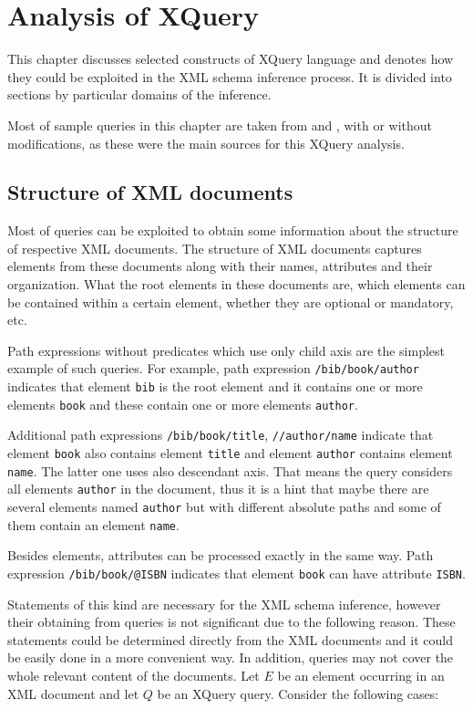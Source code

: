 \chapter{Analysis of XQuery} \label{CHAPTER_analysis_of_xquery}
This chapter discusses selected constructs of XQuery language and denotes how they could be exploited in the XML schema inference process. It is divided into sections by particular domains of the inference.

Most of sample queries in this chapter are taken from \cite{Walmsley:2007:XQU:1205865} and \cite{Marchiori:07:XQU}, with or without modifications, as these were the main sources for this XQuery analysis.

\section{Structure of XML documents}
Most of queries can be exploited to obtain some information about the structure of respective XML documents. The structure of XML documents captures elements from these documents along with their names, attributes and their organization. What the root elements in these documents are, which elements can be contained within a certain element, whether they are optional or mandatory, etc.

Path expressions without predicates which use only child axis are the simplest example of such queries. For example, path expression \texttt{/bib/book/author} indicates that element \texttt{bib} is the root element and it contains one or more elements \texttt{book} and these contain one or more elements \texttt{author}.

Additional path expressions \texttt{/bib/book/title}, \texttt{//author/name} indicate that element \texttt{book} also contains element \texttt{title} and element \texttt{author} contains element \texttt{name}. The latter one uses also descendant axis. That means the query considers all elements \texttt{author} in the document, thus it is a hint that maybe there are several elements named \texttt{author} but with different absolute paths and some of them contain an element \texttt{name}.

Besides elements, attributes can be processed exactly in the same way. Path expression \texttt{/bib/book/@ISBN} indicates that element \texttt{book} can have attribute \texttt{ISBN}.

Statements of this kind are necessary for the XML schema inference, however their obtaining from queries is not significant due to the following reason. These statements could be determined directly from the XML documents and it could be easily done in a more convenient way. In addition, queries may not cover the whole relevant content of the documents. Let $E$ be an element occurring in an XML document and let $Q$ be an XQuery query. Consider the following cases:

